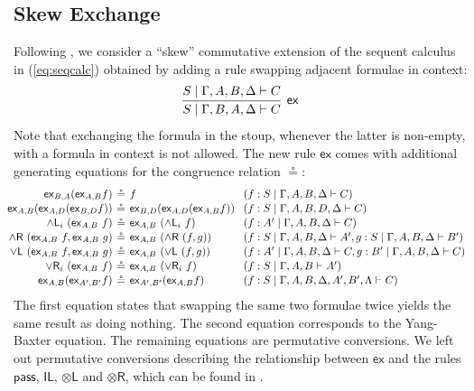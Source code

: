 \documentclass[submission,copyright,creativecommons]{eptcs}
\theoremstyle{definition}
\newcommand{\tl}{\otimes \mathsf{L}}
\newcommand{\tr}{\otimes \mathsf{R}}
\newcommand{\pass}{\mathsf{pass}}
\newcommand{\unitl}{\mathsf{IL}}
\newcommand{\andli}{\land \mathsf{L}_{i}}
\newcommand{\andr}{\land \mathsf{R}}
\newcommand{\orl}{\lor \mathsf{L}}
\newcommand{\orri}{\lor \mathsf{R}_{i}}
\newcommand{\ex}{\mathsf{ex}}
\begin{document}
\subsection{Skew Exchange}\label{subsec:Ex}

Following \cite{veltri:coherence:2021,Veltri25}, we consider a ``skew'' commutative extension of the sequent calculus in (\ref{eq:seqcalc}) obtained by adding a rule swapping adjacent  formulae in context:
\begin{equation}\label{eq:ex:rule}
  \infer[\ex]{S \mid \Gamma , B , A , \Delta \vdash C}{
    S \mid \Gamma , A , B , \Delta \vdash C
  }
\end{equation}
Note that exchanging the formula in the stoup, whenever the latter is non-empty, with a formula in context is not allowed. The new rule $\ex$ comes with additional generating equations for the congruence relation $\circeq$:
\begin{equation*}\label{fig:circeq:sym}
  \arraycolsep=2pt
  \def\arraystretch{1.1}
  \hspace{-8.9pt}
\begin{array}{rclll}
\ex_{B , A}  (\ex_{A , B}  f) &\circeq & f &&(f: S \mid \Gamma , A , B , \Delta \vdash C)
\\
\ex_{A , B}  (\ex_{A , D}  (\ex_{B , D}  f)) &\circeq & \ex_{B , D}  (\ex_{A , D}  (\ex_{A , B}  f)) &&(f : S \mid \Gamma , A , B , D , \Delta \vdash C) 
\\
  \andli \ (\ex_{A , B} \ f) &\circeq &\ex_{A , B} \ (\andli \ f) &&(f : A' \mid \Gamma , A , B , \Delta \vdash C)
  \\
  \andr \ (\ex_{A , B} \ f , \ex_{A , B} \ g) &\circeq &\ex_{A , B} \ (\andr \ (f , g)) &&(f : S \mid \Gamma , A , B , \Delta \vdash A' , g : S \mid \Gamma , A , B , \Delta \vdash B')
  \\
  \orl \ (\ex_{A , B} \ f , \ex_{A , B} \ g) &\circeq &\ex_{A , B} \ (\orl \ (f , g)) &&(f : A' \mid \Gamma , A , B , \Delta \vdash C ,  g : B' \mid \Gamma , A , B , \Delta \vdash C)
  \\
  \orri \ (\ex_{A , B} \ f) &\circeq &\ex_{A , B} \ (\orri \ f) &&(f : S \mid \Gamma , A , B \vdash A')
  \\
  \ex_{A , B}  (\ex_{A' , B'}  f) &\circeq & \ex_{A' , B'}  (\ex_{A , B}  f) &&(f: S \mid \Gamma , A , B , \Delta , A' , B' , \Lambda \vdash C)
\end{array}
\end{equation*}
The first equation states that swapping the same two formulae twice yields the same result as doing nothing.
The second equation corresponds to the Yang-Baxter equation.
The remaining equations are permutative conversions.
We left out permutative conversions describing the relationship between $\ex$ and the rules $\pass$, $\unitl$, $\tl$ and $\tr$, which can be found in \cite[Fig. 2]{veltri:coherence:2021}.
\end{document}
